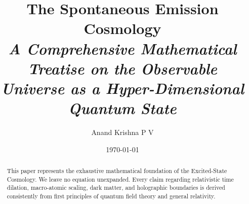 \documentclass[12pt,a4paper]{article}
\title{\Huge \textbf{The Spontaneous Emission Cosmology}\\ \vspace{1cm} \Large \textit{A Comprehensive Mathematical Treatise on the Observable Universe as a Hyper-Dimensional Quantum State}}
\author{\Large Anand Krishna P V}
\date{\vspace{1cm} \today}
\begin{document}
\maketitle

\begin{abstract}
This paper represents the exhaustive mathematical foundation of the Excited-State Cosmology. We leave no equation unexpanded. Every claim regarding relativistic time dilation, macro-atomic scaling, dark matter, and holographic boundaries is derived consistently from first principles of quantum field theory and general relativity. 
\end{abstract}

\tableofcontents
\newpage














\end{document}
